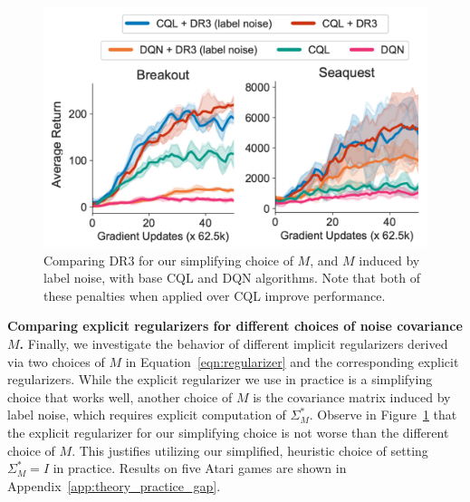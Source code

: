 \begin{figure}[t]
\small \begin{center}
\vspace{-0.2cm}
\includegraphics[width=0.6\linewidth]{figures_iclr/different_penalty.pdf}
\vspace{-10pt}
\caption{\label{fig:other_penalty_main} \footnotesize{Comparing  DR3 for our simplifying choice of $M$, and $M$ induced by label noise, {with base CQL and DQN algorithms}. Note that both of these penalties when applied over CQL improve performance.}}
\end{center}
\vspace{-0.2in}
\end{figure}
\textbf{Comparing explicit regularizers for different choices of noise covariance $M$.} Finally, we investigate the behavior of different implicit regularizers derived via two choices of $M$ in Equation~\ref{eqn:regularizer} and the corresponding explicit regularizers. While the explicit regularizer we use in practice is a simplifying choice that works well, another choice of $M$ is the covariance matrix induced by label noise, which requires explicit computation of $\Sigma_M^*$.
Observe in Figure~\ref{fig:other_penalty_main} that the {explicit regularizer for our simplifying choice is not worse than the different choice of $M$}. This justifies utilizing our simplified, heuristic choice of setting $\Sigma_M^* = I$ in practice. Results on five Atari games are shown in Appendix~\ref{app:theory_practice_gap}.       

